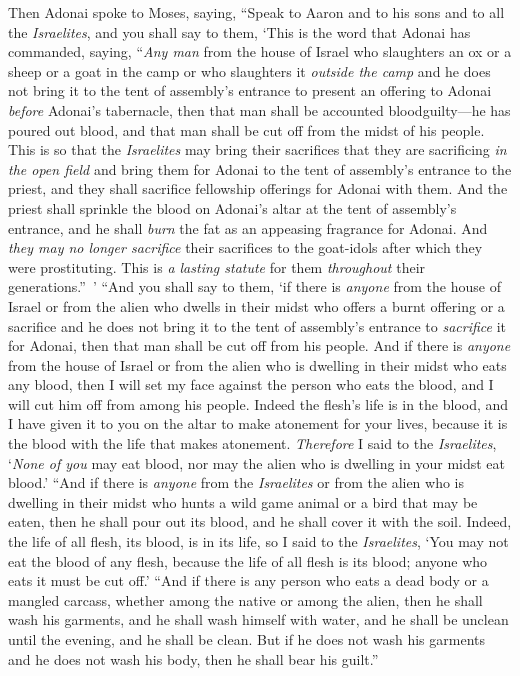 \begin{biblechapter} %
 Then Adonai spoke to Moses, saying,
\verse “Speak to Aaron and to his sons and to all the \textit{Israelites}, and you shall say to them, ‘This is the word that Adonai has commanded, saying,
\verse “\textit{Any man} from the house of Israel who slaughters an ox or a sheep or a goat in the camp or who slaughters it \textit{outside the camp}
\verse and he does not bring it to the tent of assembly’s entrance to present an offering to Adonai \textit{before} Adonai’s tabernacle, then that man shall be accounted bloodguilty—he has poured out blood, and that man shall be cut off from the midst of his people.
\verse This is so that the \textit{Israelites} may bring their sacrifices that they are sacrificing \textit{in the open field} and bring them for Adonai to the tent of assembly’s entrance to the priest, and they shall sacrifice fellowship offerings for Adonai with them.
\verse And the priest shall sprinkle the blood on Adonai’s altar at the tent of assembly’s entrance, and he shall \textit{burn} the fat as an appeasing fragrance for Adonai.
\verse And \textit{they may no longer sacrifice} their sacrifices to the goat-idols after which they were prostituting. This is \textit{a lasting statute} for them \textit{throughout} their generations.” ’
 “And you shall say to them, ‘if there is \textit{anyone} from the house of Israel or from the alien who dwells in their midst who offers a burnt offering or a sacrifice
\verse and he does not bring it to the tent of assembly’s entrance to \textit{sacrifice} it for Adonai, then that man shall be cut off from his people.
\verse And if there is \textit{anyone} from the house of Israel or from the alien who is dwelling in their midst who eats any blood, then I will set my face against the person who eats the blood, and I will cut him off from among his people.
\verse Indeed the flesh’s life is in the blood, and I have given it to you on the altar to make atonement for your lives, because it is the blood with the life that makes atonement.
\verse \textit{Therefore} I said to the \textit{Israelites}, ‘\textit{None of you} may eat blood, nor may the alien who is dwelling in your midst eat blood.’
\verse “And if there is \textit{anyone} from the \textit{Israelites} or from the alien who is dwelling in their midst who hunts a wild game animal or a bird that may be eaten, then he shall pour out its blood, and he shall cover it with the soil.
\verse Indeed, the life of all flesh, its blood, is in its life, so I said to the \textit{Israelites}, ‘You may not eat the blood of any flesh, because the life of all flesh is its blood; anyone who eats it must be cut off.’
\verse “And if there is any person who eats a dead body or a mangled carcass, whether among the native or among the alien, then he shall wash his garments, and he shall wash himself with water, and he shall be unclean until the evening, and he shall be clean.
\verse But if he does not wash his garments and he does not wash his body, then he shall bear his guilt.”
\end{biblechapter}

